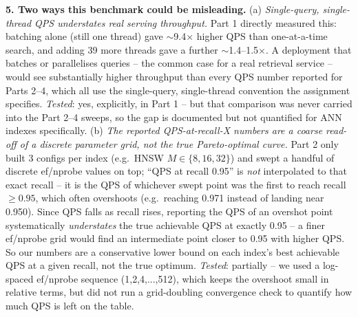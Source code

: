 \documentclass[10pt]{article}
\begin{document}
\textbf{5. Two ways this benchmark could be misleading.} (a) \emph{Single-query, single-thread
QPS understates real serving throughput.} Part 1 directly measured this: batching alone (still
one thread) gave $\sim$9.4$\times$ higher QPS than one-at-a-time search, and adding 39 more
threads gave a further $\sim$1.4--1.5$\times$. A deployment that batches or parallelises queries
-- the common case for a real retrieval service -- would see substantially higher throughput than
every QPS number reported for Parts 2--4, which all use the single-query, single-thread
convention the assignment specifies. \emph{Tested}: yes, explicitly, in Part 1 -- but that
comparison was never carried into the Part 2--4 sweeps, so the gap is documented but not
quantified for ANN indexes specifically. (b) \emph{The reported QPS-at-recall-X numbers are a
coarse read-off of a discrete parameter grid, not the true Pareto-optimal curve.} Part 2 only
built 3 configs per index (e.g.\ HNSW $M\in\{8,16,32\}$) and swept a handful of discrete
ef/nprobe values on top; ``QPS at recall 0.95'' is \emph{not} interpolated to that exact recall
-- it is the QPS of whichever swept point was the first to reach recall $\geq 0.95$, which often
overshoots (e.g.\ reaching 0.971 instead of landing near 0.950). Since QPS falls as recall rises,
reporting the QPS of an overshot point systematically \emph{understates} the true achievable QPS
at exactly 0.95 -- a finer ef/nprobe grid would find an intermediate point closer to 0.95 with
higher QPS. So our numbers are a conservative lower bound on each index's best achievable QPS at
a given recall, not the true optimum. \emph{Tested}: partially -- we used a log-spaced ef/nprobe
sequence (1,2,4,...,512), which keeps the overshoot small in relative terms, but did not run a
grid-doubling convergence check to quantify how much QPS is left on the table.
\end{document}
